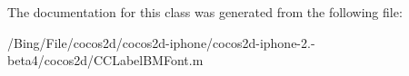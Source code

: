 The documentation for this class was generated from the following file\-:\begin{DoxyCompactItemize}
\item 
/\-Bing/\-File/cocos2d/cocos2d-\/iphone/cocos2d-\/iphone-\/2.-\/beta4/cocos2d/C\-C\-Label\-B\-M\-Font.\-m\end{DoxyCompactItemize}
